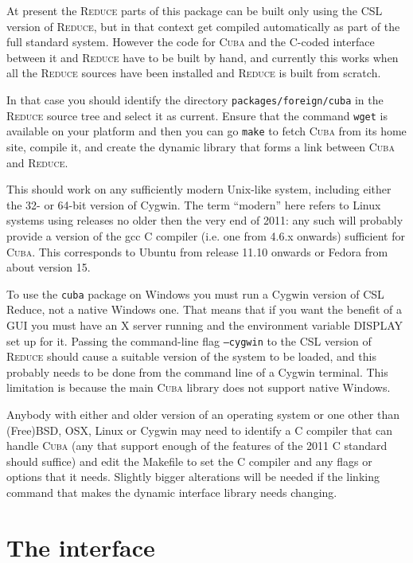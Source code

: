 \documentclass[11pt]{article}
\newcommand{\Reduce}{\textsc{Reduce}}
\newcommand{\Cuba}{\textsc{Cuba}}
\begin{document}
At present the {\Reduce} parts of this package can be built only using the CSL
version of {\Reduce}, but in that context get compiled automatically as part of
the full standard system.  However the code for {\Cuba} and the C-coded
interface between it and {\Reduce} have to be built by hand, and currently this
works when all the {\Reduce} sources have been installed and {\Reduce} is built
from scratch.

In that case you should identify the directory \texttt{packages/foreign/cuba} in
the {\Reduce} source tree and select it as current.  Ensure that the command
\texttt{wget} is available on your platform and then you can go \texttt{make} to
fetch {\Cuba} from its home site, compile it, and create the dynamic library
that forms a link between {\Cuba} and {\Reduce}.

This should work on any sufficiently modern Unix-like system, including either
the 32- or 64-bit version of Cygwin. The term ``modern'' here refers to Linux
systems using releases no older then the very end of 2011: any such will
probably provide a version of the gcc C compiler (i.e. one from 4.6.x onwards)
sufficient for {\Cuba}. This corresponds to Ubuntu from release 11.10 onwards or
Fedora from about version 15.

To use the \texttt{cuba} package on Windows you must run a Cygwin version of CSL
Reduce, not a native Windows one. That means that if you want the benefit of a
GUI you must have an X server running and the environment variable DISPLAY set
up for it.  Passing the command-line flag \texttt{--cygwin} to the CSL version
of {\Reduce} should cause a suitable version of the system to be loaded, and this
probably needs to be done from the command line of a Cygwin terminal.  This
limitation is because the main {\Cuba} library does not support native Windows.

Anybody with either and older version of an operating system or one other than
(Free)BSD, OSX, Linux or Cygwin may need to identify a C compiler that can
handle {\Cuba} (any that support enough of the features of the 2011 C standard
should suffice) and edit the Makefile to set the C compiler and any flags or
options that it needs.  Slightly bigger alterations will be needed if the
linking command that makes the dynamic interface library needs changing.


\section{The interface}
\end{document}
